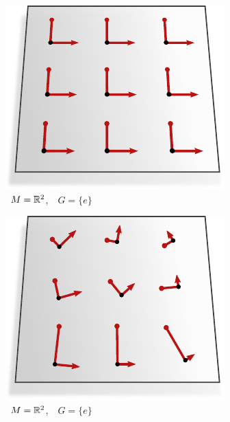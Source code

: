 

\begin{subfigure}[b]{0.26\textwidth}
    \centering
    \includegraphics[width=1.\textwidth]{figures/G_structure_R2_1_big.pdf}
    \captionsetup{format=hang}
    \caption{\small
        \,  $M = \mathbb{R}^2$,
        \,\ $G = \{e\}$
    }
    \label{fig:G_structure_intro_a}
\end{subfigure}
\hfill
\begin{subfigure}[b]{0.26\textwidth}
    \centering
    \includegraphics[width=1.\textwidth]{figures/G_structure_R2_5_big.pdf}
    \captionsetup{format=hang}
    \caption{\small
        \,  $M = \mathbb{R}^2$,
        \,\ $G = \{e\}$
    }
    \label{fig:G_structure_intro_b}
\end{subfigure}
